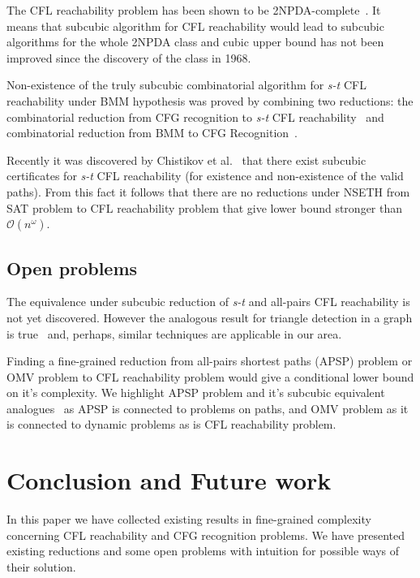 \documentclass[acmsmall,nonacm]{acmart}
\begin{document}
	The CFL reachability problem has been shown to be 2NPDA-complete~\cite{10.5555/788019.788876}. It means that subcubic algorithm for CFL reachability would lead to subcubic algorithms for the whole 2NPDA class and cubic upper bound has not been improved since the discovery of the class in 1968.
	
	Non-existence of the truly subcubic combinatorial algorithm for \emph{s-t} CFL reachability under BMM hypothesis was proved by combining two reductions: the combinatorial reduction from CFG recognition to \emph{s-t} CFL reachability~\cite{10.1145/3158118} and combinatorial reduction from BMM to CFG Recognition~\cite{10.1145/505241.505242}.
	
	Recently it was discovered by Chistikov et al.~\cite{chistikov2021subcubic} that there exist subcubic certificates for \emph{s-t} CFL reachability (for existence and non-existence of the valid paths). From this fact it follows that there are no reductions under NSETH from SAT problem to CFL reachability problem that give lower bound stronger than $\mathcal{O}(n^{\omega})$.
	
	\subsection{Open problems}
	
	The equivalence under subcubic reduction of \emph{s-t} and 
	all-pairs CFL reachability is not yet discovered. However the analogous result for triangle detection in a graph is true~\cite{10.1145/3186893} and, perhaps, similar techniques are applicable in our area. 
	
	Finding a fine-grained reduction from all-pairs shortest paths (APSP) problem or OMV problem to CFL reachability problem would give a conditional lower bound on it's complexity. We highlight APSP problem and it's subcubic equivalent analogues~\cite{10.1145/3186893} as APSP is connected to problems on paths, and OMV problem as it is connected to dynamic problems as is CFL reachability problem. 
	
	\section{Conclusion and Future work}
	
	In this paper we have collected existing results in fine-grained complexity concerning CFL reachability and CFG recognition problems. We have presented existing reductions and some open problems with intuition for possible ways of their solution. 
	
\end{document}
